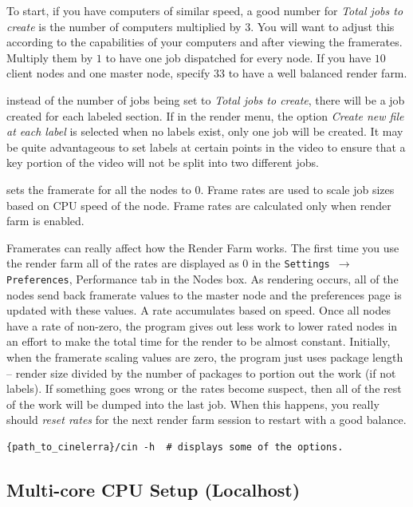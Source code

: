 \begin{description}
  To start, if you have computers of similar speed, a good number
  for \textit{Total jobs to create} is the number of computers
  multiplied by $3$.  You will want to adjust this according to the
  capabilities of your computers and after viewing the framerates.
  Multiply them by $1$ to have one job dispatched for every node.  If
  you have $10$ client nodes and one master node, specify $33$ to have
  a well balanced render farm.
\item[(overridden if new file at each label is checked)] instead of
  the number of jobs being set to \textit{Total jobs to create}, there
  will be a job created for each labeled section.  If in the render
  menu, the option \textit{Create new file at each label} is selected
  when no labels exist, only one job will be created.  It may be quite
  advantageous to set labels at certain points in the video to ensure
  that a key portion of the video will not be split into two different
  jobs.
\item[Reset rates] sets the framerate for all the nodes to $0$.
  Frame rates are used to scale job sizes based on CPU speed of the
  node.  Frame rates are calculated only when render farm is enabled.
\end{description}

Framerates can really affect how the Render Farm works.  The first
time you use the render farm all of the rates are displayed as $0$
in the \texttt{Settings $\rightarrow$ Preferences}, Performance tab
in the Nodes box.  As rendering occurs, all of the nodes send back
framerate values to the master node and the preferences page is
updated with these values.  A rate accumulates based on speed.  Once
all nodes have a rate of non-zero, the program gives out less work
to lower rated nodes in an effort to make the total time for the
render to be almost constant.  Initially, when the framerate scaling
values are zero, the program just uses package length -- render size
divided by the number of packages to portion out the work (if not
labels).  If something goes wrong or the rates become suspect, then
all of the rest of the work will be dumped into the last job.  When
this happens, you really should \textit{reset rates} for the next
render farm session to restart with a good balance.

\begin{lstlisting}[style=sh]
{path_to_cinelerra}/cin -h  # displays some of the options.
\end{lstlisting}

\subsection{Multi-core CPU Setup (Localhost)}%
\label{sub:multi_core_render_farm_setup}

